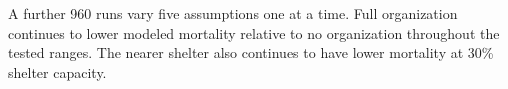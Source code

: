 A further 960 runs vary five assumptions one at a time. Full organization continues to lower modeled mortality relative to no organization throughout the tested ranges. The nearer shelter also continues to have lower mortality at 30\% shelter capacity.
